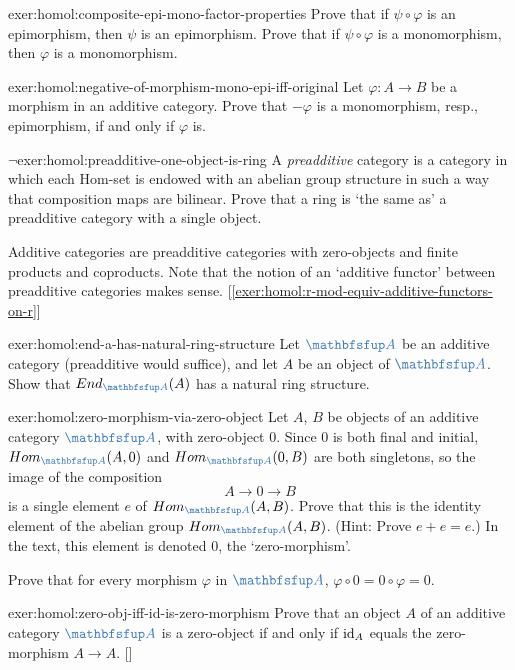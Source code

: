 \begin{exer}{}{exer:homol:composite-epi-mono-factor-properties}
  Prove that if $\psi \circ \varphi$ is an epimorphism, then $\psi$ is
  an epimorphism. Prove that if $\psi \circ \varphi$ is a
  monomorphism, then $\varphi$ is a monomorphism.
\end{exer}
\begin{exer}{}{exer:homol:negative-of-morphism-mono-epi-iff-original}
  Let $\varphi : A \to B$ be a morphism in an additive category. Prove
  that $-\varphi$ is a monomorphism, resp., epimorphism, if and only
  if $\varphi$ is.
\end{exer}
\begin{exer}{$\lnot$}{exer:homol:preadditive-one-object-is-ring}
  A \emph{preadditive} category is a category in which each Hom-set is
  endowed with an abelian group structure in such a way that
  composition maps are bilinear. Prove that a ring is `the same as' a
  preadditive category with a single object.

  Additive categories are preadditive categories with zero-objects and
  finite products and coproducts. Note that the notion of an `additive
  functor' between preadditive categories makes sense.
  [\ref{exer:homol:r-mod-equiv-additive-functors-on-r}]
\end{exer}
\begin{exer}{}{exer:homol:end-a-has-natural-ring-structure}
  Let $\categ{A}$ be an additive category (preadditive would suffice),
  and let $A$ be an object of $\categ{A}$. Show that
  $\End_{\categ{A}}(A)$ has a natural ring structure.
\end{exer}
\begin{exer}{}{exer:homol:zero-morphism-via-zero-object}
  Let $A$, $B$ be objects of an additive category $\categ{A}$, with
  zero-object $0$. Since $0$ is both final and initial,
  $\Hom_{\categ{A}}(A,0)$ and $\Hom_{\categ{A}}(0,B)$ are both
  singletons, so the image of the composition
  \[
    A \to 0 \to B
  \]
  is a single element $e$ of $\Hom_{\categ{A}}(A,B)$.  Prove that this
  is the identity element of the abelian group
  $\Hom_{\categ{A}}(A,B)$. (Hint: Prove $e+e=e$.) In the text, this
  element is denoted $0$, the `zero-morphism'.

  Prove that for every morphism $\varphi$ in $\categ{A}$,
  $\varphi \circ 0 = 0 \circ \varphi = 0$.
\end{exer}
\begin{exer}{}{exer:homol:zero-obj-iff-id-is-zero-morphism}
  \exerused{} Prove that an object $A$ of an additive category
  $\categ{A}$ is a zero-object if and only if $\operatorname{id}_A$ equals the
  zero-morphism $A \to
  A$. []
\end{exer}
